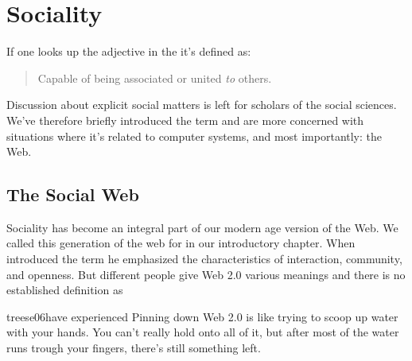 \section{Sociality}

If one looks up the adjective  in the
 \citep[]{simpson89}
it's defined as:

\begin{quote}
  Capable of being associated or united \emph{to} others.
\end{quote}

Discussion about explicit social matters is left for scholars of the social
sciences. We've therefore briefly introduced the term and are more concerned
with situations where it's related to computer systems, and most importantly:
the Web.

\subsection{The Social Web}
\label{section:background.sociality.the.social.web}

Sociality has become an integral part of our modern age version of the Web.
We called this generation of the web for %
in our introductory chapter. When \citet{oreilly05} introduced the term he
emphasized the characteristics of interaction, community, and openness.
But different people give Web 2.0 various meanings and there is no
established definition as
\begin{fullquote}[\p{15}]{treese06}{have experienced}
  Pinning down Web 2.0 is like trying to scoop up water with your hands. You
  can't really hold onto all of it, but after most of the water runs trough
  your fingers, there's still something left.
\end{fullquote}

